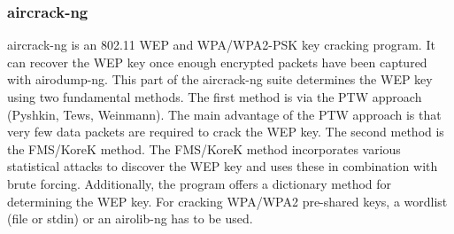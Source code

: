 \documentclass{article}
\begin{document}
\subsubsection{aircrack-ng}
aircrack-ng is an 802.11 WEP and WPA/WPA2-PSK key cracking program.
It  can  recover  the WEP key once enough encrypted packets have been captured with airodump-ng. This part of the aircrack-ng suite determines  the WEP  key  using  two  fundamental methods. The first method is via the PTW approach (Pyshkin, Tews, Weinmann). The main advantage of the PTW approach is  that very few data packets are required to crack the WEP key. The second method is the FMS/KoreK method. The FMS/KoreK method incorporates various  statistical attacks to discover the WEP key and uses these in combination with brute forcing. Additionally, the program offers a dictionary method for  determining  the WEP key. For cracking WPA/WPA2 pre-shared keys, a wordlist (file or stdin) or an airolib-ng has to be used.
\end{document}
